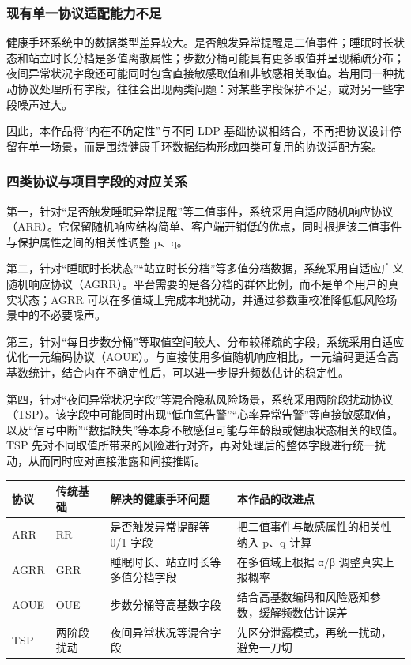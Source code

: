 \documentclass{cumcmthesis}
\numberwithin{equation}{section}
\numberwithin{figure}{section}
\numberwithin{table}{section}
\begin{document}
\subsubsection{现有单一协议适配能力不足}

健康手环系统中的数据类型差异较大。是否触发异常提醒是二值事件；睡眠时长状态和站立时长分档是多值离散属性；步数分桶可能具有更多取值并呈现稀疏分布；夜间异常状况字段还可能同时包含直接敏感取值和非敏感相关取值。若用同一种扰动协议处理所有字段，往往会出现两类问题：对某些字段保护不足，或对另一些字段噪声过大。

因此，本作品将“内在不确定性”与不同 LDP 基础协议相结合，不再把协议设计停留在单一场景，而是围绕健康手环数据结构形成四类可复用的协议适配方案。

\subsubsection{四类协议与项目字段的对应关系}

第一，针对“是否触发睡眠异常提醒”等二值事件，系统采用自适应随机响应协议（ARR）。它保留随机响应结构简单、客户端开销低的优点，同时根据该二值事件与保护属性之间的相关性调整 p、q。

第二，针对“睡眠时长状态”“站立时长分档”等多值分档数据，系统采用自适应广义随机响应协议（AGRR）。平台需要的是各分档的群体比例，而不是单个用户的真实状态；AGRR 可以在多值域上完成本地扰动，并通过参数重校准降低低风险场景中的不必要噪声。

第三，针对“每日步数分桶”等取值空间较大、分布较稀疏的字段，系统采用自适应优化一元编码协议（AOUE）。与直接使用多值随机响应相比，一元编码更适合高基数统计，结合内在不确定性后，可以进一步提升频数估计的稳定性。

第四，针对“夜间异常状况字段”等混合隐私风险场景，系统采用两阶段扰动协议（TSP）。该字段中可能同时出现“低血氧告警”“心率异常告警”等直接敏感取值，以及“信号中断”“数据缺失”等本身不敏感但可能与年龄段或健康状态相关的取值。TSP 先对不同取值所带来的风险进行对齐，再对处理后的整体字段进行统一扰动，从而同时应对直接泄露和间接推断。

\begin{table}[htbp]
\centering
\small
\begin{tabularx}{\textwidth}{|>{\raggedright\arraybackslash}X|>{\raggedright\arraybackslash}X|>{\raggedright\arraybackslash}X|>{\raggedright\arraybackslash}X|}
\hline
协议 & 传统基础 & 解决的健康手环问题 & 本作品的改进点 \\ \hline
ARR & RR & 是否触发异常提醒等 0/1 字段 & 把二值事件与敏感属性的相关性纳入 p、q 计算 \\ \hline
AGRR & GRR & 睡眠时长、站立时长等多值分档字段 & 在多值域上根据 α/β 调整真实上报概率 \\ \hline
AOUE & OUE & 步数分桶等高基数字段 & 结合高基数编码和风险感知参数，缓解频数估计误差 \\ \hline
TSP & 两阶段扰动 & 夜间异常状况等混合字段 & 先区分泄露模式，再统一扰动，避免一刀切 \\ \hline
\end{tabularx}
\end{table}
\end{document}
